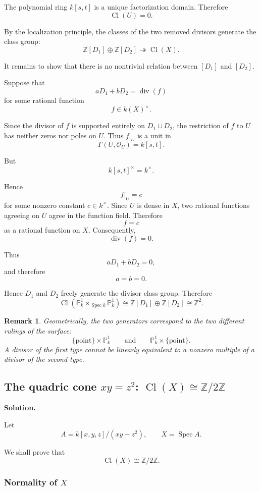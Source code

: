 \documentclass[12pt,a4paper]{article}
\DeclareMathOperator{\Spec}{Spec}
\newcommand{\OO}{\mathcal{O}}
\newcommand{\divisor}{\operatorname{div}}
\newcommand{\Z}{\mathbb{Z}}
\newcommand{\Cl}{\operatorname{Cl}}
\providecommand{\Spec}{\operatorname{Spec}}
\providecommand{\Pj}{\mathbb P}
\theoremstyle{notespace}
\newtheorem{remark}[definition]{Remark}
\begin{document}
The polynomial ring \(k[s,t]\) is a unique factorization domain. Therefore
\[
\Cl(U)=0.
\]

By the localization principle, the classes of the two removed divisors generate the class group:
\[
\Z[D_1]\oplus \Z[D_2]
\twoheadrightarrow
\Cl(X).
\]

It remains to show that there is no nontrivial relation between \([D_1]\) and \([D_2]\).

Suppose that
\[
aD_1+bD_2=\divisor(f)
\]
for some rational function
\[
f\in k(X)^\times.
\]

Since the divisor of \(f\) is supported entirely on \(D_1\cup D_2\), the restriction of \(f\) to \(U\) has neither zeros nor poles on \(U\). Thus \(f|_U\) is a unit in
\[
\Gamma(U,\OO_U)=k[s,t].
\]

But
\[
k[s,t]^\times=k^\times.
\]

Hence
\[
f|_U=c
\]
for some nonzero constant \(c\in k^\times\). Since \(U\) is dense in \(X\), two rational functions agreeing on \(U\) agree in the function field. Therefore
\[
f=c
\]
as a rational function on \(X\). Consequently,
\[
\divisor(f)=0.
\]

Thus
\[
aD_1+bD_2=0,
\]
and therefore
\[
a=b=0.
\]

Hence \(D_1\) and \(D_2\) freely generate the divisor class group. Therefore
\[
\boxed{
	\Cl\!\left(\Pj^1_k\times_{\Spec k}\Pj^1_k\right)
	\cong
	\Z[D_1]\oplus \Z[D_2]
	\cong
	\Z^2.
}
\]

\begin{remark}
	Geometrically, the two generators correspond to the two different rulings of the surface:
	\[
	\{\text{point}\}\times \Pj^1_k
	\qquad\text{and}\qquad
	\Pj^1_k\times\{\text{point}\}.
	\]
	A divisor of the first type cannot be linearly equivalent to a nonzero multiple of a divisor of the second type.
\end{remark}

\subsection{\texorpdfstring{The quadric cone \(xy=z^2\): \(\Cl(X)\cong \Z/2\Z\)}{The quadric cone xy=z2}}

\textbf{Solution.}

Let
\[
A=k[x,y,z]/(xy-z^2),
\qquad
X=\Spec A.
\]

We shall prove that
\[
\Cl(X)\cong \Z/2\Z.
\]

\subsubsection{Normality of \(X\)}
\end{document}
